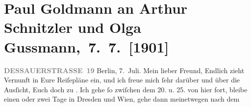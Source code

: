 

         
         \renewcommand{\erwaehntePersonen}{Personen: Paul Goldmann, Heinrich Kanner, Alfred Kerr, Olga Schnitzler, Isidor Singer, Elisabeth Steinrück}
         \renewcommand{\erwaehnteInstitutionen}{Institutionen: Die Zeit, Die Zeit. Wiener Wochenschrift, Neue Freie Presse}
         \renewcommand{\erwaehnteOrte}{Orte: Berlin, Dessauer Straße, Dresden, St. Anton am Arlberg, Urtijëi, Val Gardena, Wien, Wörthersee}
         \renewcommand{\erwaehnteWerke}{Werke: Die Zeit, Die Zeit. Wiener Wochenschrift, Neue Freie Presse}
               \section[ Paul Goldmann an Arthur Schnitzler und Olga Gussmann, 7. 7. {[}1901{]}]{ Paul Goldmann an Arthur Schnitzler und Olga
               Gussmann, 7. 7. {[}1901{]}}\nopagebreak{}\rehead{ }\begin{ledgroupsized}[t]{13cm}\normalsize\beginnumbering{} \toendnotes[C]{\smallbreak\pagebreak[2]} 
\toendnotes[C]{\smallbreak}\pstart
           \noindent{}\raggedleft{}{\pb}\textcolor{gray}{\textbf{DESSAUERSTRASSE 19}}\pend
           \pstart
           Berlin, 7. Juli.\pend
           \pstart\center{}Mein lieber Freund,\pend\pstart
           Endlich zieht Vernunft in Eure Reiſepläne ein, und ich freue mich ſehr darüber und
               über die Ausſicht, Euch doch zu \label{K_L03072-1v}\label{K_L03072-1h}. Ich gehe ſo zwiſchen dem 20. u. 25. von hier fort, bleibe einen oder zwei Tage in Dresden und Wien, gehe dann meinetwegen nach dem \label{K_L03072-2v}
\end{ledgroupsized}
